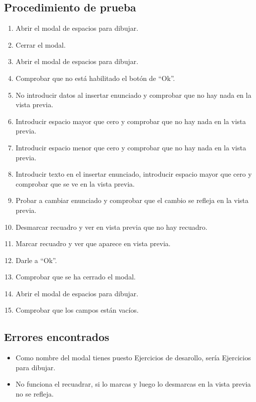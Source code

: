 \subsection{Procedimiento de prueba}
\label{procedimientoPruebas:dibujar}
\begin{enumerate}
    \item Abrir el modal de espacios para dibujar.
    \item Cerrar el modal.
    \item Abrir el modal de espacios para dibujar.
    \item Comprobar que no está habilitado el botón de ``Ok''.
    \item No introducir datos al insertar enunciado y comprobar que no hay nada en la vista previa.
    \item Introducir espacio mayor que cero y comprobar que no hay nada en la vista previa.
    \item Introducir espacio menor que cero y comprobar que no hay nada en la vista previa.
    \item Introducir texto en el insertar enunciado, introducir espacio  mayor que cero y comprobar que se ve en la vista previa.
    \item Probar a cambiar enunciado y comprobar que el cambio se refleja en la vista previa.
    \item Desmarcar recuadro y ver en vista previa que no hay recuadro.
    \item Marcar recuadro y ver que aparece en vista previa.
    \item Darle a ``Ok''.
    \item Comprobar que se ha cerrado el modal.
    \item Abrir el modal de  espacios para dibujar.
    \item Comprobar que los campos están vacíos.
\end{enumerate}

\subsection{Errores encontrados}
\label{errores:espacio}
\begin{itemize}
    \item  Como nombre del modal tienes puesto Ejercicios de desarollo, sería Ejercicios para dibujar.
    \item No funciona el recuadrar, si lo marcas y luego lo desmarcas en la vista previa no se refleja.
\end{itemize}

